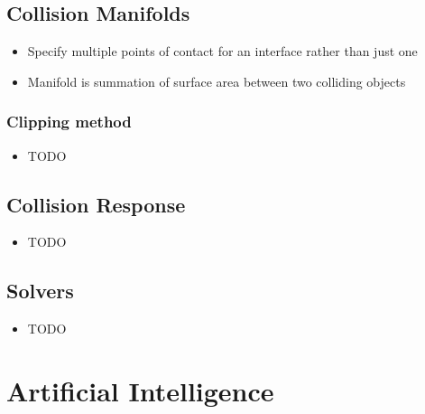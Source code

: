 \documentclass[a4paper]{article}
\begin{document}
\subsection{Collision Manifolds}

\begin{itemize}
  \item
    Specify multiple points of contact for an interface rather than just one

  \item
    Manifold is summation of surface area between two colliding objects

\end{itemize}

\subsubsection{Clipping method}

\begin{itemize}
  \item
    TODO

\end{itemize}

\subsection{Collision Response}

\begin{itemize}
  \item
    TODO

\end{itemize}

\subsection{Solvers}

\begin{itemize}
  \item
    TODO

\end{itemize}

\section{Artificial Intelligence}
\end{document}
